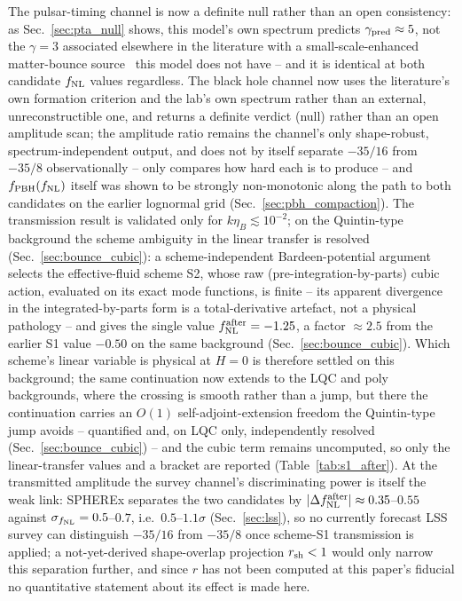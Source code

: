 \documentclass[aps,prd,twocolumn,superscriptaddress,nofootinbib,longbibliography]{revtex4-2}
\newcommand{\fnl}{f_{\rm NL}}
\newcommand{\fpbh}{f_{\rm PBH}}
\begin{document}
The pulsar-timing channel is now a definite null rather than an open
consistency: as Sec.~\ref{sec:pta_null} shows, this model's own
spectrum predicts $\gamma_{\rm pred}\approx5$, not the $\gamma=3$
associated elsewhere in the literature with a small-scale-enhanced
matter-bounce source~\cite{Papanikolaou2025} this model does not have --
and it is identical at both candidate $\fnl$ values regardless. The
black hole channel now uses the literature's own formation criterion and the
lab's own spectrum rather than an external, unreconstructible one, and
returns a definite verdict (null) rather than an open amplitude scan; the
amplitude ratio remains the channel's only shape-robust, spectrum-independent
output, and does not by itself separate $-35/16$ from $-35/8$ observationally
-- only compares how hard each is to produce -- and $\fpbh(\fnl)$ itself was
shown to be strongly non-monotonic along the path to both candidates on the
earlier lognormal grid (Sec.~\ref{sec:pbh_compaction}). The transmission
result is validated only for $k\eta_B\lesssim10^{-2}$; on the Quintin-type
background the scheme ambiguity in the linear transfer is resolved
(Sec.~\ref{sec:bounce_cubic}): a scheme-independent Bardeen-potential
argument selects the effective-fluid scheme S2, whose raw
(pre-integration-by-parts) cubic action, evaluated on its exact mode
functions, is finite -- its apparent divergence in the
integrated-by-parts form is a total-derivative artefact, not a physical
pathology -- and gives the single value $\fnl^{\rm after}=-1.25$, a factor
$\approx2.5$ from the earlier S1 value $-0.50$ on the same
background (Sec.~\ref{sec:bounce_cubic}). Which scheme's linear variable
is physical at $H=0$ is therefore settled on this background; the same
continuation now extends to the LQC and poly backgrounds, where the
crossing is smooth rather than a jump, but there the continuation carries
an $O(1)$ self-adjoint-extension freedom the Quintin-type jump avoids --
quantified and, on LQC only, independently resolved
(Sec.~\ref{sec:bounce_cubic}) -- and the cubic term remains uncomputed, so
only the linear-transfer values and a bracket are reported
(Table~\ref{tab:s1_after}). At the transmitted amplitude
the survey channel's discriminating power is itself the weak link: SPHEREx
separates the two candidates by $|\Delta\fnl^{\rm after}|\approx0.35$--$0.55$
against $\sigma_{\fnl}=0.5$--$0.7$, i.e.\ $0.5$--$1.1\sigma$
(Sec.~\ref{sec:lss}), so no currently forecast LSS survey can distinguish
$-35/16$ from $-35/8$ once scheme-S1 transmission is applied; a
not-yet-derived shape-overlap projection $r_{\rm sh}<1$ would only narrow this
separation further, and since $r$ has not been computed at this paper's
fiducial no quantitative statement about its effect is made here.
\end{document}
